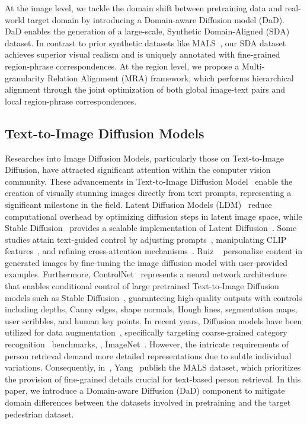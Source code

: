 At the image level, we tackle the domain shift between pretraining data and real-world target domain by introducing a Domain-aware Diffusion model (DaD). DaD enables the generation of a large-scale, Synthetic Domain-Aligned (SDA) dataset. In contrast to prior synthetic datasets like MALS~\cite{yang2023towards}, our SDA dataset achieves superior visual realism and is uniquely annotated with fine-grained region-phrase correspondences.
At the region level, we propose a Multi-granularity Relation Alignment (MRA) framework, which performs hierarchical alignment through the joint optimization of both global image-text pairs and local region-phrase correspondences.






\subsection{Text-to-Image Diffusion Models}
\noindent Researches into Image Diffusion Models, particularly those on Text-to-Image Diffusion, have attracted significant attention within the computer vision community. 
These advancements in Text-to-Image Diffusion Model~\cite{rombach2021highresolution} enable the creation of visually stunning images directly from text prompts, representing a significant milestone in the field. 
Latent Diffusion Models (LDM)~\cite{rombach2021highresolution} reduce computational overhead by optimizing diffusion steps in latent image space, while Stable Diffusion~\cite{sd15} provides a scalable implementation of Latent Diffusion~\cite{rombach2021highresolution}. 
Some studies attain text-guided control by adjusting prompts~\cite{hertz2022prompt}, manipulating CLIP features~\cite{kim2022diffusionclip}, and refining cross-attention mechanisms~\cite{parmar2023zero}.
Ruiz \etal ~\cite{ruiz2022dreambooth} personalize content in generated images by fine-tuning the image diffusion model with user-provided examples. 
Furthermore, ControlNet~\cite{zhang2023adding} represents a neural network architecture that enables conditional control of large pretrained Text-to-Image Diffusion models such as Stable Diffusion~\cite{sd15}, guaranteeing high-quality outputs with controls including depths, Canny edges, shape normals, Hough lines, segmentation maps, user scribbles, and human key points. 
In recent years, Diffusion models have been utilized for data augmentation~\cite{yang2024beyond}, specifically targeting coarse-grained category recognition~\cite{azizi2023synthetic} benchmarks, \eg, ImageNet~\cite{deng2009imagenet}.
However, the intricate requirements of person retrieval demand more detailed representations due to subtle individual variations. 
Consequently, in~\cite{yang2023towards}, Yang \etal ~publish the MALS dataset, which prioritizes the provision of fine-grained details crucial for text-based person retrieval.
In this paper, we introduce a Domain-aware Diffusion (DaD) component to mitigate domain differences between the datasets involved in pretraining and the target pedestrian dataset.







